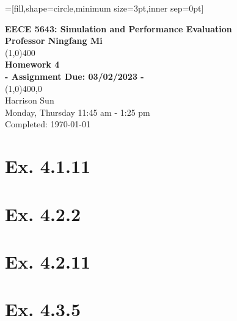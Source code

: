 \documentclass[11]{article}
\begin{document}
=[fill,shape=circle,minimum size=3pt,inner sep=0pt]

\begin{titlepage}
\begin{center}
\vspace*{2cm}
\Large{\textbf{EECE 5643: Simulation and Performance Evaluation}}\\
\Large{\textbf{Professor Ningfang Mi}}\\
\vfill
\line(1,0){400}\\[1mm]
\huge{\textbf{Homework 4}}\\[3mm]
\Large{\textbf{- Assignment Due: 03/02/2023 -}}\\[1mm]
\line(1,0){400,0}\\
\vfill
Harrison Sun\\
Monday, Thursday 11:45 am - 1:25 pm \\
Completed: \today\
\end{center}
\end{titlepage}

\section{\textbf{Ex. 4.1.11}}

\pagebreak

\section{\textbf{Ex. 4.2.2}}

\pagebreak

\section{\textbf{Ex. 4.2.11}}

\pagebreak

\section{\textbf{Ex. 4.3.5}}

\end{document}
